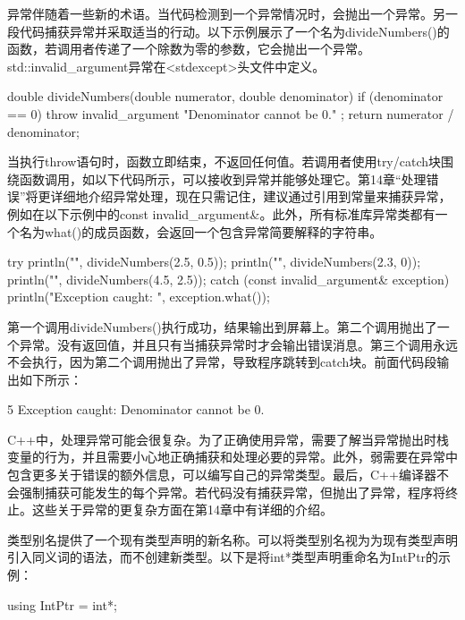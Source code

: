 异常伴随着一些新的术语。当代码检测到一个异常情况时，会抛出一个异常。另一段代码捕获异常并采取适当的行动。以下示例展示了一个名为divideNumbers()的函数，若调用者传递了一个除数为零的参数，它会抛出一个异常。std::invalid\_argument异常在<stdexcept>头文件中定义。

\begin{cpp}
double divideNumbers(double numerator, double denominator)
{
    if (denominator == 0) {
        throw invalid_argument { "Denominator cannot be 0." };
    }
    return numerator / denominator;
}
\end{cpp}


当执行throw语句时，函数立即结束，不返回任何值。若调用者使用try/catch块围绕函数调用，如以下代码所示，可以接收到异常并能够处理它。第14章“处理错误”将更详细地介绍异常处理，现在只需记住，建议通过引用到常量来捕获异常，例如在以下示例中的const invalid\_argument\&。此外，所有标准库异常类都有一个名为what()的成员函数，会返回一个包含异常简要解释的字符串。

\begin{cpp}
try {
    println("{}", divideNumbers(2.5, 0.5));
    println("{}", divideNumbers(2.3, 0));
    println("{}", divideNumbers(4.5, 2.5));
} catch (const invalid_argument& exception) {
    println("Exception caught: {}", exception.what());
}
\end{cpp}

第一个调用divideNumbers()执行成功，结果输出到屏幕上。第二个调用抛出了一个异常。没有返回值，并且只有当捕获异常时才会输出错误消息。第三个调用永远不会执行，因为第二个调用抛出了异常，导致程序跳转到catch块。前面代码段输出如下所示：

\begin{shell}
5
Exception caught: Denominator cannot be 0.
\end{shell}

C++中，处理异常可能会很复杂。为了正确使用异常，需要了解当异常抛出时栈变量的行为，并且需要小心地正确捕获和处理必要的异常。此外，弱需要在异常中包含更多关于错误的额外信息，可以编写自己的异常类型。最后，C++编译器不会强制捕获可能发生的每个异常。若代码没有捕获异常，但抛出了异常，程序将终止。这些关于异常的更复杂方面在第14章中有详细的介绍。


类型别名提供了一个现有类型声明的新名称。可以将类型别名视为为现有类型声明引入同义词的语法，而不创建新类型。以下是将int*类型声明重命名为IntPtr的示例：

\begin{cpp}
using IntPtr = int*;
\end{cpp}

